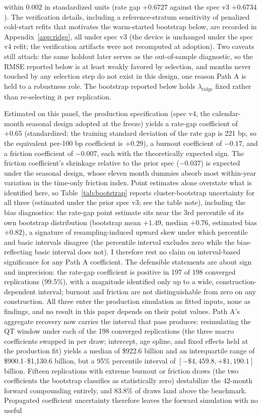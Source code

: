 \documentclass[12pt]{article}
\begin{document}
within $0.002$ in standardized units (rate gap $+0.6727$ against the spec v3 $+0.6734$). The verification details, including a reference-stratum sensitivity of penalized cold-start refits that motivates the warm-started bootstrap below, are recorded in Appendix~\ref{app:ridge}, all under spec v3 (the device is unchanged under the spec v4 refit; the verification artifacts were not recomputed at adoption). Two caveats still attach: the same holdout later serves as the out-of-sample diagnostic, so the RMSE reported below is at least weakly favored by selection, and months never touched by any selection step do not exist in this design, one reason Path A is held to a robustness role. The bootstrap reported below holds $\lambda_{\mathrm{ridge}}$ fixed rather than re-selecting it per replication.

Estimated on this panel, the production specification (spec v4, the calendar-month seasonal design adopted at the freeze) yields a rate-gap coefficient of $+0.65$ (standardized; the training standard deviation of the rate gap is 221 bp, so the equivalent per-100 bp coefficient is $+0.29$), a burnout coefficient of $-0.17$, and a friction coefficient of $-0.007$, each with the theoretically expected sign. The friction coefficient's shrinkage relative to the prior spec ($-0.037$) is expected under the seasonal design, whose eleven month dummies absorb most within-year variation in the time-only friction index. Point estimates alone overstate what is identified here, so Table~\ref{tab:bootstrap} reports cluster-bootstrap uncertainty for all three (estimated under the prior spec v3; see the table note), including the bias diagnostics: the rate-gap point estimate sits near the 3rd percentile of its own bootstrap distribution (bootstrap mean $+1.49$, median $+0.76$, estimated bias $+0.82$), a signature of resampling-induced upward skew under which percentile and basic intervals disagree (the percentile interval excludes zero while the bias-reflecting basic interval does not). I therefore rest no claim on interval-based significance for any Path A coefficient. The defensible statements are about sign and imprecision: the rate-gap coefficient is positive in 197 of 198 converged replications (99.5\%), with a magnitude identified only up to a wide, construction-dependent interval; burnout and friction are not distinguishable from zero on any construction. All three enter the production simulation as fitted inputs, none as findings, and no result in this paper depends on their point values. Path A's aggregate recovery now carries the interval that pass produces: resimulating the QT window under each of the 198 converged replications (the three macro coefficients swapped in per draw; intercept, age spline, and fixed effects held at the production fit) yields a median of \$922.6 billion and an interquartile range of \$900.1--\$1{,}130.6 billion, but a 95\% percentile interval of $[-\$4{,}459.8, +\$1{,}190.1]$ billion. Fifteen replications with extreme burnout or friction draws (the two coefficients the bootstrap classifies as statistically zero) destabilize the 42-month forward compounding entirely, and 83.8\% of draws land above the benchmark. Propagated coefficient uncertainty therefore leaves the forward simulation with no useful 
\end{document}
